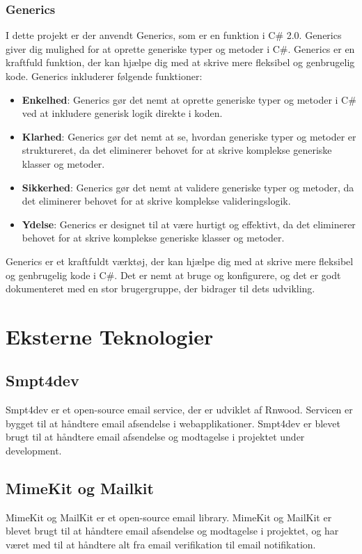 \subsubsection{Generics}
I dette projekt er der anvendt Generics, som er en funktion i C\# 2.0. Generics giver dig mulighed for at oprette generiske typer og metoder i C\#. Generics er en kraftfuld funktion, der kan hjælpe dig med at skrive mere fleksibel og genbrugelig kode.
Generics inkluderer følgende funktioner:
\begin{itemize}
    \item \textbf{Enkelhed}: Generics gør det nemt at oprette generiske typer og metoder i C\# ved at inkludere generisk logik direkte i koden.
    \item \textbf{Klarhed}: Generics gør det nemt at se, hvordan generiske typer og metoder er struktureret, da det eliminerer behovet for at skrive komplekse generiske klasser og metoder.
    \item \textbf{Sikkerhed}: Generics gør det nemt at validere generiske typer og metoder, da det eliminerer behovet for at skrive komplekse valideringslogik.
    \item \textbf{Ydelse}: Generics er designet til at være hurtigt og effektivt, da det eliminerer behovet for at skrive komplekse generiske klasser og metoder.
\end{itemize}
Generics er et kraftfuldt værktøj, der kan hjælpe dig med at skrive mere fleksibel og genbrugelig kode i C\#. Det er nemt at bruge og konfigurere, og det er godt dokumenteret med en stor brugergruppe, der bidrager til dets udvikling.




\section{Eksterne Teknologier}
\subsection{Smpt4dev}
Smpt4dev er et open-source email service, der er udviklet af Rnwood. Servicen er bygget til at håndtere email afsendelse i webapplikationer.
Smpt4dev er blevet brugt til at håndtere email afsendelse og modtagelse i projektet under development.

\subsection{MimeKit og Mailkit}
MimeKit og MailKit er et open-source email library. MimeKit og MailKit er blevet brugt til at håndtere email afsendelse og modtagelse i projektet, og har været med til at håndtere alt fra email verifikation til email notifikation.